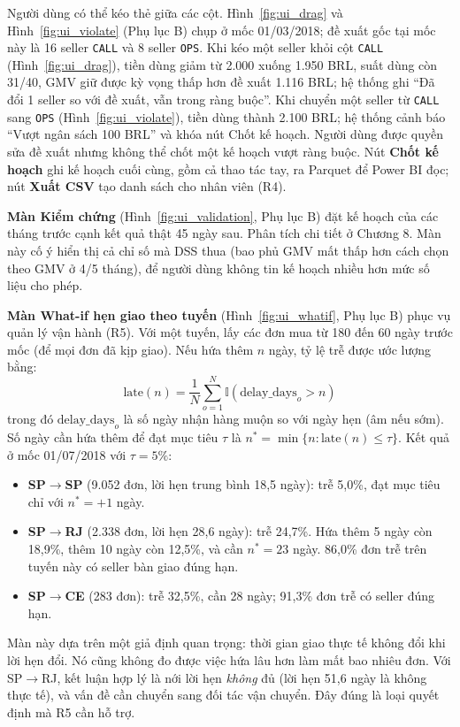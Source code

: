 Người dùng có thể kéo thẻ giữa các cột. Hình~\ref{fig:ui_drag} và Hình~\ref{fig:ui_violate} (Phụ lục B) chụp ở mốc 01/03/2018; đề xuất gốc tại mốc này là 16 seller \texttt{CALL} và 8 seller \texttt{OPS}. Khi kéo một seller khỏi cột \texttt{CALL} (Hình~\ref{fig:ui_drag}), tiền dùng giảm từ 2.000 xuống 1.950 BRL, suất dùng còn 31/40, GMV giữ được kỳ vọng thấp hơn đề xuất 1.116 BRL; hệ thống ghi ``Đã đổi 1 seller so với đề xuất, vẫn trong ràng buộc''. Khi chuyển một seller từ \texttt{CALL} sang \texttt{OPS} (Hình~\ref{fig:ui_violate}), tiền dùng thành 2.100 BRL; hệ thống cảnh báo ``Vượt ngân sách 100 BRL'' và khóa nút Chốt kế hoạch. Người dùng được quyền sửa đề xuất nhưng không thể chốt một kế hoạch vượt ràng buộc. Nút \textbf{Chốt kế hoạch} ghi kế hoạch cuối cùng, gồm cả thao tác tay, ra Parquet để Power BI đọc; nút \textbf{Xuất CSV} tạo danh sách cho nhân viên (R4).





\textbf{Màn Kiểm chứng} (Hình~\ref{fig:ui_validation}, Phụ lục B) đặt kế hoạch của các tháng trước cạnh kết quả thật 45 ngày sau. Phân tích chi tiết ở Chương 8. Màn này cố ý hiển thị cả chỉ số mà DSS thua (bao phủ GMV mất thấp hơn cách chọn theo GMV ở 4/5 tháng), để người dùng không tin kế hoạch nhiều hơn mức số liệu cho phép.


\textbf{Màn What-if hẹn giao theo tuyến} (Hình~\ref{fig:ui_whatif}, Phụ lục B) phục vụ quản lý vận hành (R5). Với một tuyến, lấy các đơn mua từ 180 đến 60 ngày trước mốc (để mọi đơn đã kịp giao). Nếu hứa thêm $n$ ngày, tỷ lệ trễ được ước lượng bằng:
\begin{equation}
\text{late}(n) = \frac{1}{N} \sum_{o=1}^{N} \mathbb{I}(\text{delay\_days}_o > n)
\end{equation}
trong đó $\text{delay\_days}_o$ là số ngày nhận hàng muộn so với ngày hẹn (âm nếu sớm). Số ngày cần hứa thêm để đạt mục tiêu $\tau$ là $n^* = \min\{n : \text{late}(n) \le \tau\}$. Kết quả ở mốc 01/07/2018 với $\tau = 5\%$:
\begin{itemize}
    \item \textbf{SP$\rightarrow$SP} (9.052 đơn, lời hẹn trung bình 18,5 ngày): trễ 5,0\%, đạt mục tiêu chỉ với $n^* = +1$ ngày.
    \item \textbf{SP$\rightarrow$RJ} (2.338 đơn, lời hẹn 28,6 ngày): trễ 24,7\%. Hứa thêm 5 ngày còn 18,9\%, thêm 10 ngày còn 12,5\%, và cần $n^* = 23$ ngày. 86,0\% đơn trễ trên tuyến này có seller bàn giao đúng hạn.
    \item \textbf{SP$\rightarrow$CE} (283 đơn): trễ 32,5\%, cần 28 ngày; 91,3\% đơn trễ có seller đúng hạn.
\end{itemize}
Màn này dựa trên một giả định quan trọng: thời gian giao thực tế không đổi khi lời hẹn đổi. Nó cũng không đo được việc hứa lâu hơn làm mất bao nhiêu đơn. Với SP$\rightarrow$RJ, kết luận hợp lý là nới lời hẹn \emph{không} đủ (lời hẹn 51,6 ngày là không thực tế), và vấn đề cần chuyển sang đối tác vận chuyển. Đây đúng là loại quyết định mà R5 cần hỗ trợ.

